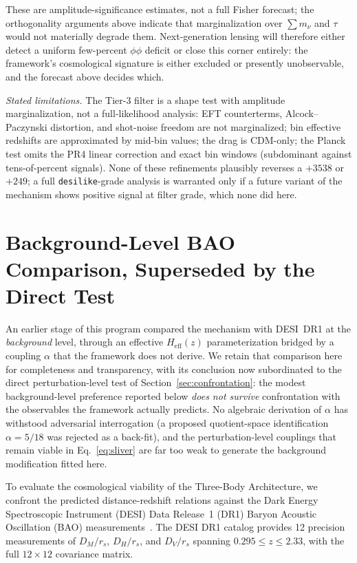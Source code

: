 \documentclass[aps,prd,twocolumn,superscriptaddress,nofootinbib]{revtex4-2}
\theoremstyle{definition}
\theoremstyle{remark}
\begin{document}
These are amplitude-significance estimates, not a full Fisher
forecast; the orthogonality arguments above indicate that
marginalization over $\sum m_\nu$ and $\tau$ would not materially
degrade them. Next-generation lensing will therefore either detect a
uniform few-percent $\phi\phi$ deficit or close this corner entirely:
the framework's cosmological signature is either excluded or presently
unobservable, and the forecast above decides which.

\emph{Stated limitations.} The Tier-3 filter is a shape test with
amplitude marginalization, not a full-likelihood analysis: EFT
counterterms, Alcock--Paczynski distortion, and shot-noise freedom are
not marginalized; bin effective redshifts are approximated by mid-bin
values; the drag is CDM-only; the Planck test omits the PR4 linear
correction and exact bin windows (subdominant against tens-of-percent
signals). None of these refinements plausibly reverses a $+3538$ or
$+249$; a full \texttt{desilike}-grade analysis is warranted only if a
future variant of the mechanism shows positive signal at filter grade,
which none did here.


\section{Background-Level BAO Comparison, Superseded by the Direct Test}
\label{sec:results}

An earlier stage of this program compared the mechanism with DESI~DR1
at the \emph{background} level, through an effective
$H_{\mathrm{eff}}(z)$ parameterization bridged by a coupling $\alpha$
that the framework does not derive. We retain that comparison here for
completeness and transparency, with its conclusion now subordinated to
the direct perturbation-level test of
Section~\ref{sec:confrontation}: the modest background-level preference
reported below \emph{does not survive} confrontation with the
observables the framework actually predicts. No algebraic derivation of
$\alpha$ has withstood adversarial interrogation (a proposed
quotient-space identification $\alpha = 5/18$ was rejected as a
back-fit), and the perturbation-level couplings that remain viable in
Eq.~\eqref{eq:sliver} are far too weak to generate the background
modification fitted here.

To evaluate the cosmological viability of the Three-Body Architecture, we
confront the predicted distance-redshift relations against the Dark Energy
Spectroscopic Instrument (DESI) Data Release~1 (DR1) Baryon Acoustic
Oscillation (BAO) measurements~\cite{DESI2024}. The DESI DR1 catalog
provides 12 precision measurements of $D_M/r_s$, $D_H/r_s$, and
$D_V/r_s$ spanning $0.295 \le z \le 2.33$, with the full $12 \times 12$
covariance matrix.
\end{document}
